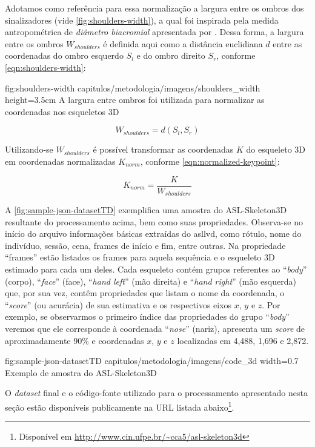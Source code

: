 \begin{enumerate}
          Adotamos como referência para essa normalização a largura entre os ombros dos sinalizadores (vide \autoref{fig:shoulders-width}), a qual foi inspirada pela medida antropométrica de \textit{diâmetro biacromial} apresentada por . Dessa forma, a largura entre os ombros \(W_{shoulders}\) é definida aqui como a distância euclidiana \(d\) entre as coordenadas do ombro esquerdo \(S_{l}\) e do ombro direito \(S_ {r}\), conforme \autoref{eqn:shoulders-width}:

          \figura
          {fig:shoulders-width} %
          {capitulos/metodologia/imagens/shoulders_width} %
          {height=3.5cm} %
          {A largura entre ombros foi utilizada para normalizar as coordenadas nos esqueletos 3D} %
          {} %

          \begin{equation}
              \label{eqn:shoulders-width}
              W_{shoulders} = d\left(S_{l}, S_{r}\right)
          \end{equation}

          Utilizando-se \(W_{shoulders}\) é possível transformar as coordenadas \(K\) do esqueleto 3D em coordenadas normalizadas \(K_{norm}\), conforme \autoref{eqn:normalized-keypoint}:

          \begin{equation}
              \label{eqn:normalized-keypoint}
              K_{norm} = \frac{K}{W_{shoulders}}
          \end{equation}

\end{enumerate}


A \autoref{fig:sample-json-datasetTD} exemplifica uma amostra do ASL-Skeleton3D resultante do processamento acima, bem como suas propriedades. Observa-se no início do arquivo informações básicas extraídas do \acrshort{asllvd}, como rótulo, nome do indivíduo, sessão, cena, frames de início e fim, entre outras. Na propriedade ``frames'' estão listados os frames para aquela sequência e o esqueleto 3D estimado para cada um deles. Cada esqueleto contém grupos referentes ao ``\textit{body}'' (corpo), ``\textit{face}'' (face), ``\textit{hand left}'' (mão direita) e ``\textit{hand right}'' (mão esquerda) que, por sua vez, contêm propriedades que listam o nome da coordenada, o ``\textit{score}'' (ou acurácia) de sua estimativa e os respectivos eixos \(x\), \(y\) e \(z\).
Por exemplo, se observarmos o primeiro índice das propriedades do grupo ``\textit{body}'' veremos que ele corresponde à coordenada ``\textit{nose}'' (nariz), apresenta um \textit{score} de aproximadamente 90\% e coordenadas \(x\), \(y\) e \(z\) localizadas em 4,488, 1,696 e 2,872.

\figura
{fig:sample-json-datasetTD} %
{capitulos/metodologia/imagens/code_3d} %
{width=0.7\linewidth} %
{Exemplo de amostra do ASL-Skeleton3D} %
{} %

O \textit{dataset} final e o código-fonte utilizado para o processamento apresentado nesta seção estão disponíveis publicamente na URL listada abaixo\footnote{Disponível em \url{http://www.cin.ufpe.br/~cca5/asl-skeleton3d}}.

